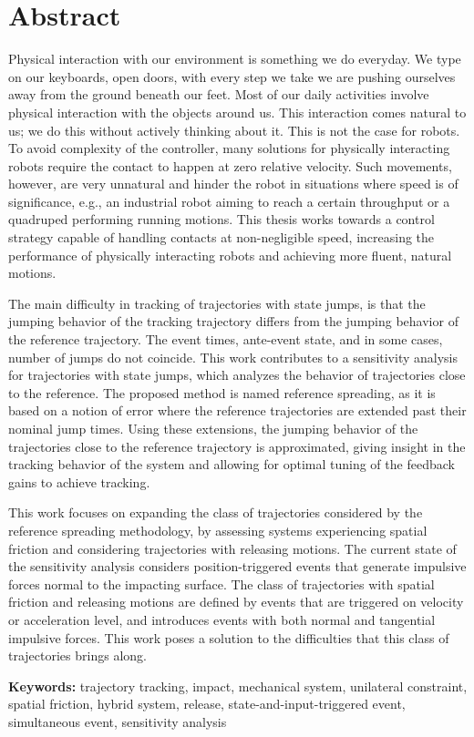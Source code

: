 \documentclass[../DC2019003Bouma.tex]{subfiles}
\begin{document}
\cleartooddpage
{}
\chapter*{Abstract}
Physical interaction with our environment is something we do everyday. We type on our keyboards, open doors, with every step we take we are pushing ourselves away from the ground beneath our feet. Most of our daily activities involve physical interaction with the objects around us. This interaction comes natural to us; we do this without actively thinking about it. This is not the case for robots. To avoid complexity of the controller, many solutions for physically interacting robots require the contact to happen at zero relative velocity. Such movements, however, are very unnatural and hinder the robot in situations where speed is of significance, e.g., an industrial robot aiming to reach a certain throughput or a quadruped performing running motions. This thesis works towards a control strategy capable of handling contacts at non-negligible speed, increasing the performance of physically interacting robots and achieving more fluent, natural motions.

The main difficulty in tracking of trajectories with state jumps, is that the jumping behavior of the tracking trajectory differs from the jumping behavior of the reference trajectory. The event times, ante-event state, and in some cases, number of jumps do not coincide. This work contributes to a sensitivity analysis for trajectories with state jumps, which analyzes the behavior of trajectories close to the reference. The proposed method is named reference spreading, as it is based on a notion of error where the reference trajectories are extended past their nominal jump times. Using these extensions, the jumping behavior of the trajectories close to the reference trajectory is approximated, giving insight in the tracking behavior of the system and allowing for optimal tuning of the feedback gains to achieve tracking. 

This work focuses on expanding the class of trajectories considered by the reference spreading methodology, by assessing systems experiencing spatial friction and considering trajectories with releasing motions. The current state of the sensitivity analysis considers position-triggered events that generate impulsive forces normal to the impacting surface. The class of trajectories with spatial friction and releasing motions are defined by events that are triggered on velocity or acceleration level, and introduces events with both normal and tangential impulsive forces. This work poses a solution to the difficulties that this class of trajectories brings along.


\textbf{Keywords:} \quad trajectory tracking, impact, mechanical system, unilateral constraint, spatial friction, hybrid system, release, state-and-input-triggered event, simultaneous event, sensitivity analysis
\end{document}
